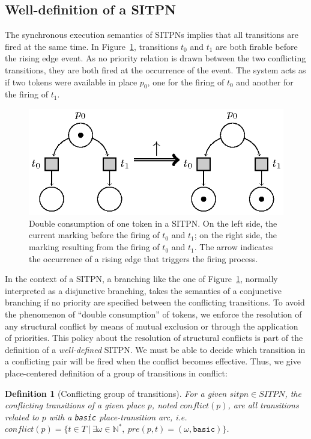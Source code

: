 \documentclass[pdflatex,sn-mathphys]{sn-jnl}%
\theoremstyle{thmstyleone}%
\theoremstyle{thmstyletwo}%
\theoremstyle{thmstylethree}%
\newtheorem{definition}{Definition}%
\begin{document}
\subsection{Well-definition of a SITPN}
\label{sec:sitpn-wd}

The synchronous execution semantics of SITPNs implies that all
transitions are fired at the same time. In
Figure~\ref{fig:double-consum}, transitions $t_0$ and $t_1$ are both
firable before the rising edge event. As no priority relation is drawn
between the two conflicting transitions, they are both fired at the
occurrence of the event. The system acts as if two tokens were
available in place $p_0$, one for the firing of $t_0$ and another for
the firing of $t_1$.

\begin{figure}[H]
  \centering
  \includegraphics[keepaspectratio=true, width=.5\textwidth]{double-consum.eps}
  \caption[Double consumption of token in a SITPN.]{Double consumption
    of one token in a SITPN. On the left side, the current marking
    before the firing of $t_0$ and $t_1$; on the right side, the
    marking resulting from the firing of $t_0$ and $t_1$. The arrow
    indicates the occurrence of a rising edge that triggers the firing
    process.}
  \label{fig:double-consum}
\end{figure}

In the context of a SITPN, a branching like the one of
Figure~\ref{fig:double-consum}, normally interpreted as a disjunctive
branching, takes the semantics of a conjunctive branching if no
priority are specified between the conflicting transitions. To avoid
the phenomenon of ``double consumption'' of tokens, we enforce the
resolution of any structural conflict by means of mutual exclusion or
through the application of priorities. This policy about the
resolution of structural conflicts is part of the definition of a
\emph{well-defined} SITPN. We must be able to decide which transition
in a conflicting pair will be fired when the conflict becomes
effective. Thus, we give place-centered definition of a group of
transitions in conflict:

\begin{definition}[Conflicting group of transitions]
  \label{def:cgroup}
  For a given $sitpn\in{}SITPN$, the conflicting transitions of a
  given place $p$, noted $conflict(p)$, are all transitions related to
  $p$ with a \texttt{basic} place-transition arc,
  i.e.
  $conflict(p)=\{t\in{}T~\vert~\exists{}\omega\in\mathbb{N}^{*},~pre(p,t)=(\omega,\mathtt{basic})\}$.
\end{definition}
\end{document}
